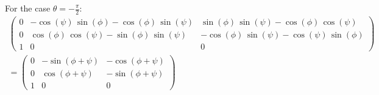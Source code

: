 \documentclass[a4paper]{scrreprt}
\begin{document}
For the case $\theta=-\frac{\pi}{2}$: 
\begin{gather}
\left(\begin{array}{ccc} 
0 &  -\cos\left(\psi\right)\,\sin\left(\phi 
\right)-\cos\left(\phi 
\right)\,\sin\left(\psi\right) & \sin\left(\phi 
\right)\,\sin\left(\psi\right)-\cos\left(\phi 
\right)\,\cos\left(\psi\right)\\ 
0 &  \cos\left(\phi \right)\,\cos\left(\psi\right)-\sin\left(\phi 
\right)\,\sin\left(\psi\right) & -\cos\left(\phi 
\right)\,\sin\left(\psi\right)-\cos\left(\psi\right)\,\sin\left(\phi
\right)\\
1 &  	0 & 0 
\end{array}\right) \\
= 
\left(\begin{array}{ccc} 
0 &  -\sin(\phi+\psi) & -\cos(\phi+\psi) \\ 
0 &  \cos(\phi+\psi) & -\sin(\phi+\psi) \\
1 &  	0 & 0 
\end{array}\right)
\end{gather}
\end{document}
